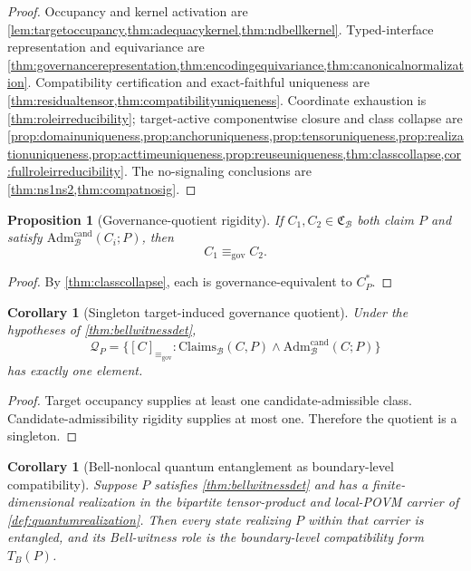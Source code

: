 \documentclass[11pt]{article}
\newtheorem{proposition}[theorem]{Proposition}
\newtheorem{corollary}[theorem]{Corollary}
\theoremstyle{definition}
\newcommand{\Bell}{\mathcal{B}}
\newcommand{\GovEq}{\equiv_{\mathrm{gov}}}
\newcommand{\BellConstr}{\mathfrak{C}_{\Bell}}
\newcommand{\AdmBell}{\mathrm{Adm}^{\mathrm{cand}}_{\Bell}}
\newcommand{\ClaimsBell}{\mathrm{Claims}_{\Bell}}
\newcommand{\TargetQ}{\mathcal Q_{P}}
\newcommand{\CanonC}{C^{*}_{P}}
\begin{document}
\begin{proof}
Occupancy and kernel activation are \cref{lem:targetoccupancy,thm:adequacykernel,thm:ndbellkernel}. Typed-interface representation and equivariance are \cref{thm:governancerepresentation,thm:encodingequivariance,thm:canonicalnormalization}. Compatibility certification and exact-faithful uniqueness are \cref{thm:residualtensor,thm:compatibilityuniqueness}. Coordinate exhaustion is \cref{thm:roleirreducibility}; target-active componentwise closure and class collapse are \cref{prop:domainuniqueness,prop:anchoruniqueness,prop:tensoruniqueness,prop:realizationuniqueness,prop:acttimeuniqueness,prop:reuseuniqueness,thm:classcollapse,cor:fullroleirreducibility}. The no-signaling conclusions are \cref{thm:ns1ns2,thm:compatnosig}.
\end{proof}

\begin{proposition}[Governance-quotient rigidity]\label{prop:rigidity}
If $C_1,C_2\in\BellConstr$ both claim $P$ and satisfy $\AdmBell(C_i;P)$, then
\[
C_1\GovEq C_2.
\]
\end{proposition}

\begin{proof}
By \cref{thm:classcollapse}, each is governance-equivalent to $\CanonC$.
\end{proof}

\begin{corollary}[Singleton target-induced governance quotient]\label{cor:singletonquotient}
Under the hypotheses of \cref{thm:bellwitnessdet},
\[
\TargetQ=\bigl\{[C]_{\GovEq}:\ClaimsBell(C,P)\wedge\AdmBell(C;P)\bigr\}
\]
has exactly one element.
\end{corollary}

\begin{proof}
Target occupancy supplies at least one candidate-admissible class. Candidate-admissibility rigidity supplies at most one. Therefore the quotient is a singleton.
\end{proof}

\begin{corollary}[Bell-nonlocal quantum entanglement as boundary-level compatibility]\label{cor:quantumentanglement}
Suppose $P$ satisfies \cref{thm:bellwitnessdet} and has a finite-dimensional realization in the bipartite tensor-product and local-POVM carrier of \cref{def:quantumrealization}. Then every state realizing $P$ within that carrier is entangled, and its Bell-witness role is the boundary-level compatibility form $T_B(P)$.
\end{corollary}
\end{document}
